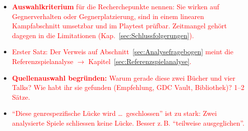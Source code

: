 \documentclass[../Main.tex]{subfiles}
\begin{document}
\begin{itemize}[leftmargin=1.5cm]
    \item \textcolor{red}{\textbf{Auswahlkriterium} für die Recherchepunkte nennen: Sie wirken auf Gegnerverhalten oder Gegnerplatzierung, sind in einem linearen Kampfabschnitt umsetzbar und im Playtest prüfbar. Zeitmangel gehört dagegen in die Limitationen (Kap.~\ref{sec:Schlussfolgerungen}).}
    \item \textcolor{red}{Erster Satz: Der Verweis auf Abschnitt~\ref{sec:Analysefragebogen} meint die Referenzspielanalyse $\rightarrow$ Kapitel~\ref{sec:Referenzspielanalyse}.}
    \item \textcolor{red}{\textbf{Quellenauswahl begründen:} Warum gerade diese zwei Bücher und vier Talks? Wie habt ihr sie gefunden (Empfehlung, GDC Vault, Bibliothek)? 1--2 Sätze.}
    \item \textcolor{red}{\enquote{Diese genrespezifische Lücke wird \ldots\ geschlossen} ist zu stark: Zwei analysierte Spiele schliessen keine Lücke. Besser z.\,B. \enquote{teilweise ausgeglichen}.}
\end{itemize}
\end{document}
